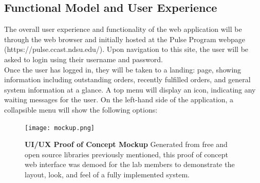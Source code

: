 \documentclass[12pt, letterpaper,oneocolumn]{article}
\begin{document}
	\subsection{Functional Model and User Experience}
The overall user experience and functionality of the web application will be through the web browser and initially hosted at the Pulse Program webpage (https://pulse.ccast.ndsu.edu/). Upon navigation to this site, the user will be asked to login using their username and password. \\
Once the user has logged in, they will be taken to a landing: page, showing information including outstanding orders, recently fulfilled orders, and general system information at a glance. A top menu will display an icon, indicating any waiting messages for the user. On the left-hand side of the application, a collapsible menu will show the following options:\\

\begin{center}
	\begin{figure}[H]
	\texttt{[image: mockup.png]}
		\caption{\textbf{UI/UX Proof of Concept Mockup} Generated from free and open source libraries previously mentioned, this proof of concept web interface was demoed for the lab members to demonstrate the layout, look, and feel of a fully implemented system.}
		\end{figure}
\end{center}
\end{document}
